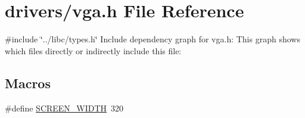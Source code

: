 \hypertarget{a00059}{}\section{drivers/vga.h File Reference}
\label{a00059}
{\ttfamily \#include \char`\"{}../libc/types.\+h\char`\"{}}\newline
Include dependency graph for vga.\+h\+:
This graph shows which files directly or indirectly include this file\+:
\subsection*{Macros}
\begin{DoxyCompactItemize}
\item 
\#define \hyperlink{a00059_a2cd109632a6dcccaa80b43561b1ab700_a2cd109632a6dcccaa80b43561b1ab700}{S\+C\+R\+E\+E\+N\+\_\+\+W\+I\+D\+TH}~320
\end{DoxyCompactItemize}
